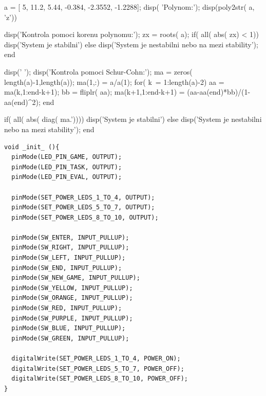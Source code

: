 \begin{matlab}[frame=single,float=htbp,caption={Příklad Schur-Cohnova testu stability v~prostředí Matlab.},label=lst:priklad.vypis.kodu.Matlab,numberstyle=\scriptsize, numbersep=7pt]

a = [ 5, 11.2, 5.44, -0.384, -2.3552, -1.2288];
disp( 'Polynom:'); disp(poly2str( a, 'z'))

disp('Kontrola pomoci korenu polynomu:');
zx = roots( a);
if( all( abs( zx) < 1))
    disp('System je stabilni')
else
    disp('System je nestabilni nebo na mezi stability');
end

disp(' '); disp('Kontrola pomoci Schur-Cohn:');
ma = zeros( length(a)-1,length(a));
ma(1,:) = a/a(1);
for( k~= 1:length(a)-2)
    aa = ma(k,1:end-k+1);
    bb = fliplr( aa);
    ma(k+1,1:end-k+1) = (aa-aa(end)*bb)/(1-aa(end)^2);
end

if( all( abs( diag( ma.'))))
    disp('System je stabilni')
else
    disp('System je nestabilni nebo na mezi stability');
end
\end{matlab}

\noindent
\begin{minipage}{\linewidth}

\begin{lstlisting}[frame=single,numbers=right,caption={Funkce init v~jazyce C++.},label=lst:priklad.vypis.kodu.C,basicstyle=\ttfamily\small, keywordstyle=\color{black}\bfseries\underbar,]
void _init_ (){
  pinMode(LED_PIN_GAME, OUTPUT);
  pinMode(LED_PIN_TASK, OUTPUT);
  pinMode(LED_PIN_EVAL, OUTPUT);

  pinMode(SET_POWER_LEDS_1_TO_4, OUTPUT);
  pinMode(SET_POWER_LEDS_5_TO_7, OUTPUT);
  pinMode(SET_POWER_LEDS_8_TO_10, OUTPUT);

  pinMode(SW_ENTER, INPUT_PULLUP);
  pinMode(SW_RIGHT, INPUT_PULLUP);
  pinMode(SW_LEFT, INPUT_PULLUP);
  pinMode(SW_END, INPUT_PULLUP);
  pinMode(SW_NEW_GAME, INPUT_PULLUP);
  pinMode(SW_YELLOW, INPUT_PULLUP);
  pinMode(SW_ORANGE, INPUT_PULLUP);
  pinMode(SW_RED, INPUT_PULLUP);
  pinMode(SW_PURPLE, INPUT_PULLUP);
  pinMode(SW_BLUE, INPUT_PULLUP);
  pinMode(SW_GREEN, INPUT_PULLUP);

  digitalWrite(SET_POWER_LEDS_1_TO_4, POWER_ON); 
  digitalWrite(SET_POWER_LEDS_5_TO_7, POWER_OFF);
  digitalWrite(SET_POWER_LEDS_8_TO_10, POWER_OFF);
}
\end{lstlisting}
\end{minipage}







